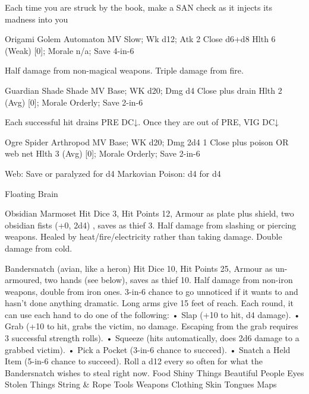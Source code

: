 {  \MONSTERBLOCK[
    Name=Furious Book,
    Link=monster-furious-book,
    MV=Fast,
    WK=d20,
    DMG=2d4 1 Close,
    HD=3,
    Power=Weak,
    Soak=0,
    Morale=Fanatical,
    Save=d8+1,
    Extras={Aberration}
  ]

Each time you are struck by the book, make a SAN check as it injects its madness into you

  \MONSTERBLOCK[
    Name=Paper Bee,
    Link=monster-paper-bee,
    MV=Fast,
    WK=d24,
    DMG=d4 to 1 Close,
    HD=1,
    Power=Weak,
    Soak=0,
    Morale=Fanatical,
    Save=d4,
    Extras={}
  ]


Origami Golem
Automaton
MV Slow; Wk d12; Atk 2 Close d6+d8
Hlth 6 (Weak) [0]; Morale n/a; Save 4-in-6

Half damage from non-magical weapons.  Triple damage from fire. 

Guardian Shade
Shade
MV Base; WK d20; Dmg d4 Close plus drain
Hlth 2 (Avg) [0]; Morale Orderly; Save 2-in-6

Each successful hit drains PRE DC↓.  Once they are out of PRE, VIG DC↓

Ogre Spider
Arthropod
MV Base; WK d20; Dmg 2d4 1 Close plus poison OR web net
Hlth 3 (Avg) [0]; Morale Orderly; Save 2-in-6

Web: Save or paralyzed for d4 Markovian
Poison: d4 for d4


Floating Brain

Obsidian Marmoset
Hit Dice 3, Hit Points 12, Armour as plate plus
shield, two obsidian fists (+0, 2d4) , saves as thief 3.
Half damage from slashing or piercing weapons.
Healed by heat/fire/electricity rather than taking
damage. Double damage from cold.

Bandersnatch (avian, like a heron)
Hit Dice 10, Hit Points 25, Armour as un-
armoured, two hands (see below), saves as thief 10.
Half damage from non-iron weapons, double from
iron ones.
3-in-6 chance to go unnoticed if it wants to and hasn’t
done anything dramatic.
Long arms give 15 feet of reach.
Each round, it can use each hand to do one of the
following:
• Slap (+10 to hit, d4 damage).
• Grab (+10 to hit, grabs the victim, no damage.
Escaping from the grab requires 3 successful
strength rolls).
• Squeeze (hits automatically, does 2d6 damage
to a grabbed victim).
• Pick a Pocket (3-in-6 chance to succeed).
• Snatch a Held Item (5-in-6 chance to succeed).
Roll a d12 every so often for what the Bandersnatch
wishes to steal right now.
Food
Shiny Things
Beautiful People
Eyes
Stolen Things
String \& Rope
Tools
Weapons
Clothing
Skin
Tongues
Maps

}
